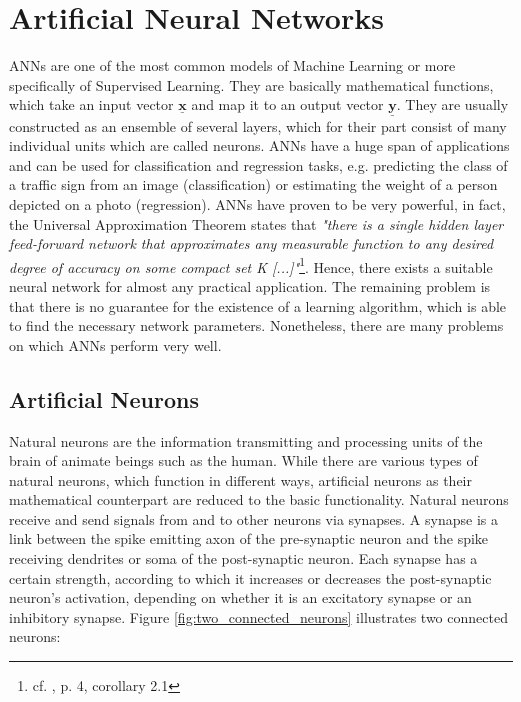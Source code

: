 \documentclass[11pt, a4paper]{article}
\newcommand\q[1]{\emph{"#1"}}
\newcommand\V[1]{\ensuremath{\underline{\mathbf{#1}}}}
\begin{document}
\newpage


\section{Artificial Neural Networks}
\label{sec:anns}

\acp{ANN} are one of the most common models of Machine Learning or more specifically of Supervised Learning. They are basically mathematical functions, which take an input vector \V{x} and map it to an output vector \V{y}. They are usually constructed as an ensemble of several layers, which for their part consist of many individual units which are called neurons. \acp{ANN} have a huge span of applications and can be used for classification and regression tasks, e.g. predicting the class of a traffic sign from an image (classification) or estimating the weight of a person depicted on a photo (regression). \acp{ANN} have proven to be very powerful, in fact, the Universal Approximation Theorem states that \q{there is a single hidden layer feed-forward network that approximates any measurable function to any desired degree of accuracy on some compact set K [...]}\footnote{cf. \cite{uat}, p. 4, corollary 2.1}. Hence, there exists a suitable neural network for almost any practical application. The remaining problem is that there is no guarantee for the existence of a learning algorithm, which is able to find the necessary network parameters. Nonetheless, there are many problems on which \acp{ANN} perform very well.

\subsection{Artificial Neurons}

Natural neurons are the information transmitting and processing units of the brain of animate beings such as the human. While there are various types of natural neurons, which function in different ways, artificial neurons as their mathematical counterpart are reduced to the basic functionality. Natural neurons receive and send signals from and to other neurons via synapses. A synapse is a link between the spike emitting axon of the pre-synaptic neuron and the spike receiving dendrites or soma of the post-synaptic neuron. Each synapse has a certain strength, according to which it increases or decreases the post-synaptic neuron's activation, depending on whether it is an excitatory synapse or an inhibitory synapse. Figure \ref{fig:two_connected_neurons} illustrates two connected neurons:
\end{document}
